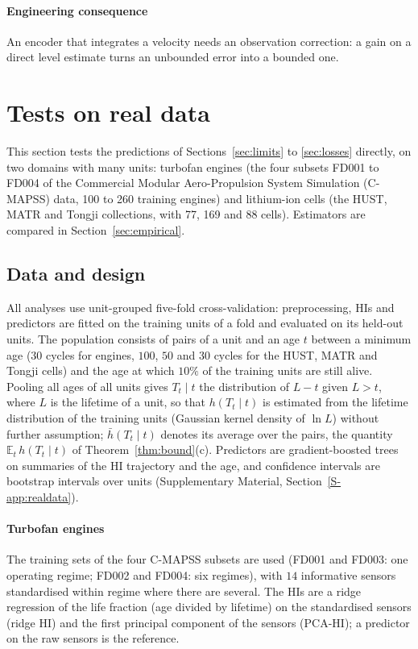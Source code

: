 \documentclass[preprint,12pt]{elsarticle}
\theoremstyle{definition}
\newcommand{\E}{\mathbb{E}}
\begin{document}
\paragraph{Engineering consequence} An encoder that integrates a velocity needs an observation correction: a gain on a direct level estimate turns an unbounded error into a bounded one.

\section{Tests on real data}
\label{sec:realdata}
This section tests the predictions of Sections~\ref{sec:limits} to \ref{sec:losses} directly, on two domains with many units: turbofan engines (the four subsets FD001 to FD004 of the Commercial Modular Aero-Propulsion System Simulation (C-MAPSS) data, 100 to 260 training engines) and lithium-ion cells (the HUST, MATR and Tongji collections, with 77, 169 and 88 cells). Estimators are compared in Section~\ref{sec:empirical}.

\subsection{Data and design}
All analyses use unit-grouped five-fold cross-validation: preprocessing, HIs and predictors are fitted on the training units of a fold and evaluated on its held-out units. The population consists of pairs of a unit and an age $t$ between a minimum age ($30$ cycles for engines, $100$, $50$ and $30$ cycles for the HUST, MATR and Tongji cells) and the age at which $10\%$ of the training units are still alive. Pooling all ages of all units gives $T_t\mid t$ the distribution of $L-t$ given $L>t$, where $L$ is the lifetime of a unit, so that $h(T_t\mid t)$ is estimated from the lifetime distribution of the training units (Gaussian kernel density of $\ln L$) without further assumption; $\bar h(T_t\mid t)$ denotes its average over the pairs, the quantity $\E_t\,h(T_t\mid t)$ of Theorem~\ref{thm:bound}(c). Predictors are gradient-boosted trees on summaries of the HI trajectory and the age, and confidence intervals are bootstrap intervals over units (Supplementary Material, Section~\ref{S-app:realdata}).

\paragraph{Turbofan engines} The training sets of the four C-MAPSS subsets are used (FD001 and FD003: one operating regime; FD002 and FD004: six regimes), with $14$ informative sensors standardised within regime where there are several. The HIs are a ridge regression of the life fraction (age divided by lifetime) on the standardised sensors (ridge HI) and the first principal component of the sensors (PCA-HI); a predictor on the raw sensors is the reference.
\end{document}
